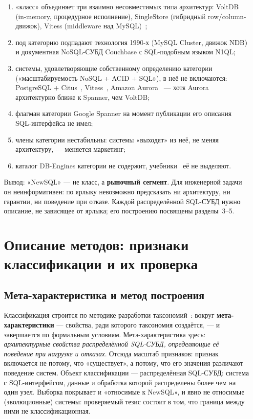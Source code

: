 \documentclass{misisarticle}
\begin{document}
\begin{enumerate}
\item «класс» объединяет три взаимно несовместимых типа архитектур: VoltDB (in-memory, процедурное исполнение), SingleStore (гибридный row/column-движок), Vitess (middleware над MySQL)~\cite{pavlo};
\item под категорию подпадают технология 1990-х (MySQL Cluster, движок NDB) и документная NoSQL-СУБД Couchbase с SQL-подобным языком N1QL;
\item системы, удовлетворяющие собственному определению категории («масштабируемость NoSQL + ACID + SQL»), в неё не включаются: PostgreSQL + Citus~\cite{citus}, Vitess~\cite{vitess}, Amazon Aurora~\cite{aurora} --- хотя Aurora архитектурно ближе к Spanner, чем VoltDB;
\item флагман категории Google Spanner на момент публикации его описания~\cite{spanner} SQL-интерфейса не имел;
\item члены категории нестабильны: системы «выходят» из неё, не меняя архитектуру, --- меняется маркетинг;
\item каталог DB-Engines категории не содержит, учебники~\cite{elmasri,kleppmann} её не выделяют.
\end{enumerate}

Вывод: «NewSQL» --- не класс, а \textbf{рыночный сегмент}. Для инженерной задачи он неинформативен: по ярлыку невозможно предсказать ни архитектуру, ни гарантии, ни поведение при отказе. Каждой распределённой SQL-СУБД нужно описание, не зависящее от ярлыка; его построению посвящены разделы~3--5.

\section{Описание методов: признаки классификации и их проверка}

\subsection{Мета-характеристика и метод построения}

Классификация строится по методике разработки таксономий~\cite{nickerson}: вокруг \textbf{мета-характеристики} --- свойства, ради которого таксономия создаётся, --- и завершается по формальным условиям. Мета-характеристика здесь: \emph{архитектурные свойства распределённой SQL-СУБД, определяющие её поведение при нагрузке и отказах}. Отсюда масштаб признаков: признак включается не потому, что «существует», а потому, что его значения различают поведение систем. Объект классификации --- распределённая SQL-СУБД: система с SQL-интерфейсом, данные и обработка которой распределены более чем на один узел. Выборка покрывает и «относимые к NewSQL», и явно не относимые (эволюционные) системы: проверяемый тезис состоит в том, что граница между ними не классификационная.
\end{document}
